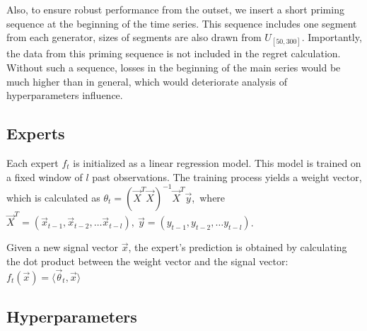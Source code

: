 \documentclass[12pt, twoside]{article}
\begin{document}
Also, to ensure robust performance from the outset, we insert a short priming sequence at the beginning of the time series. 
This sequence includes one segment from each generator, sizes of segments are also drawn from  $U_{[50, 300]}$.
 Importantly, the data from this priming sequence is not included in the regret calculation. 
 Without such a sequence, losses in the beginning of the main series would be much higher than in general, which would deteriorate analysis of hyperparameters influence.
 
\subsection{Experts}
Each expert $f_t$ is initialized as a linear regression model. 
This model is trained on a fixed window of $l$ past observations. 
The training process yields a weight vector, which is calculated as  
$\theta_t = (\vec X^T\vec X)^{-1}\vec X^T\vec y$,\ where $\vec X^T = (\vec x_{t-1}, \vec x_{t-2}, \dots \vec x_{t-l}),\ \vec y = (y_{t-1}, y_{t-2}, \dots y_{t-l})$. 

Given a new signal vector  $\vec x$, the expert's prediction is obtained by calculating the dot product between the weight vector and the signal vector: $f_t(\vec x) = \langle \vec \theta_t, \vec x \rangle$ 

\subsection{Hyperparameters}
\end{document}
